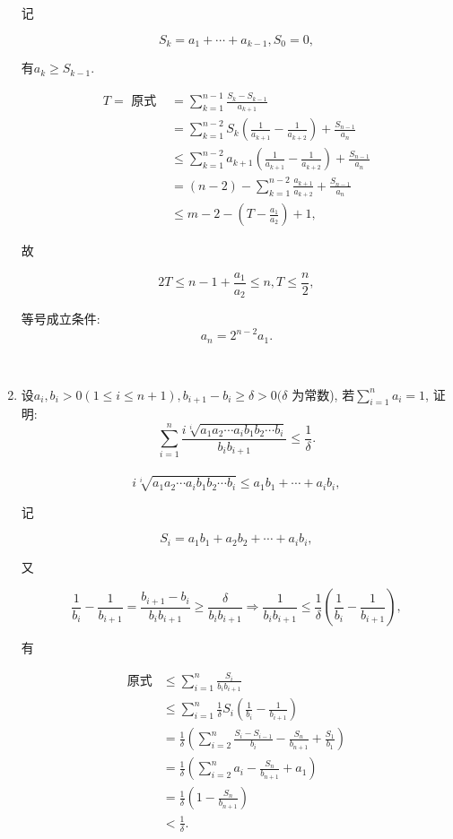 \documentclass[8pt]{article}
\begin{document}
\begin{enumerate}
			记

			$$S_k = a_1 + \cdots + a_{k-1}, S_0 = 0,$$

			有$a_k \geq S_{k-1}.$

			\begin{align*}
				T=\text{ 原式 } &= \sum_{k=1}^{n-1} \frac{S_k - S_{k-1}}{a_{k+1}}\\
				&= \sum_{k=1}^{n-2} S_k \left(\frac{1}{a_{k+1}} - \frac{1}{a_{k+2}}\right) + \frac{S_{n-1}}{a_n}\\
				&\leq \sum_{k=1}^{n-2} a_{k+1} \left(\frac{1}{a_{k+1}} - \frac{1}{a_{k+2}}\right) + \frac{S_{n-1}}{a_n}\\
				&= (n-2) - \sum_{k=1}^{n-2} \frac{a_{k+1}}{a_{k+2}} + \frac{S_{n-1}}{a_n}\\
				&\leq m-2 - \left(T-\frac{a_1}{a_2} \right) + 1,
			\end{align*}

			故

			$$2T \leq n-1 + \frac{a_1}{a_2} \leq n, T\leq \frac{n}{2},$$

			等号成立条件: $$a_n = 2^{n-2} a_1.$$

		~\\

		\item 设$a_i, b_i > 0 (1 \leq i \leq n+1), b_{i+1} - b_i \geq \delta > 0 (\delta$ 为常数), 若$\displaystyle \sum_{i=1}^{n} a_i = 1$, 证明: $$\sum_{i=1}^{n} \frac{i\sqrt[i]{a_1 a_2 \cdots a_i b_1 b_2 \cdots b_i}}{b_i b_{i+1}} \leq \frac{1}{\delta}.$$
			~\\

			$$i\sqrt[i]{a_1 a_2 \cdots a_i b_1 b_2 \cdots b_i} \leq a_1 b_1 + \cdots + a_i b_i,$$

			记

			$$S_i = a_1 b_1 + a_2 b_2 + \cdots + a_i b_i,$$

			又

			$$\frac{1}{b_i}-\frac{1}{b_{i+1}} = \frac{b_{i+1} - b_i}{b_i b_{i+1}} \geq \frac{\delta}{b_i b_{i+1}} \Rightarrow \frac{1}{b_i b_{i+1}} \leq \frac{1}{\delta}\left(\frac{1}{b_i} - \frac{1}{b_{i+1}}\right),$$

			有

			\begin{align*}
				\text{原式} &\leq \sum_{i=1}^{n} \frac{S_i}{b_i b_{i+1}}\\
				&\leq \sum_{i=1}^{n} \frac{1}{\delta} S_i \left(\frac{1}{b_i} - \frac{1}{b_{i+1}}\right)\\
				&= \frac{1}{\delta} \left(\sum_{i=2}^{n} \frac{S_i - S_{i-1}}{b_i} - \frac{S_n}{b_{n+1}} + \frac{S_1}{b_1}\right)\\
				&= \frac{1}{\delta} \left(\sum_{i=2}^{n} a_i - \frac{S_n}{b_{n+1}}+a_1\right)\\
				&= \frac{1}{\delta} \left(1-\frac{S_n}{b_{n+1}}\right)\\
				&< \frac{1}{\delta}.
			\end{align*}


\end{enumerate}
\end{document}
